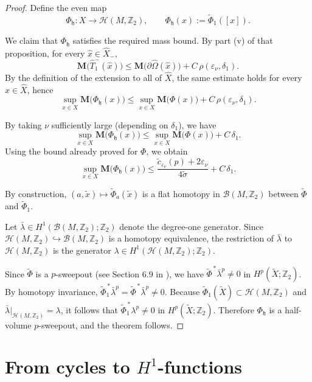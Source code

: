\documentclass[12pt,english]{article}
\theoremstyle{definition}
\begin{document}
\begin{proof}
Define the even map
\[
\Phi_{\mathfrak h}:X\to \mathcal H(M,\mathbb{Z}_2),\qquad \Phi_{\mathfrak h}(x):=\tilde\Phi_1([x]).
\]

We claim that $\Phi_{\mathfrak h}$ satisfies the required mass bound. By part (v) of that proposition, for every $\hat x\in \widehat X_-$,
\[
\mathbf M\bigl(\widehat T_1^-(\hat x)\bigr)
\le \mathbf M\bigl(\partial\widehat\Omega(\hat x)\bigr)+C\,\rho(\varepsilon_\nu,\delta_1).
\]
By the definition of the extension to all of $\widehat X$, the same estimate holds for every
$\hat x\in\widehat X$, hence
\[
\sup_{x\in X}\mathbf M\bigl(\Phi_{\mathfrak h}(x)\bigr)
\le
\sup_{x\in X}\mathbf M\bigl(\Phi(x)\bigr)+C\,\rho(\varepsilon_\nu,\delta_1).
\]

By taking $\nu$ sufficiently large (depending on $\delta_1$), we have
\[
\sup_{x\in X}\mathbf M\bigl(\Phi_{\mathfrak h}(x)\bigr)
\le
\sup_{x\in X}\mathbf M\bigl(\Phi(x)\bigr)+C\,\delta_1.
\]
Using the bound already proved for $\Phi$, we obtain
\[
\sup_{x\in X}\mathbf M\bigl(\Phi_{\mathfrak h}(x)\bigr)
\le
\frac{\tilde c_{\varepsilon_\nu}(p)+2\varepsilon_\nu}{4\tilde\sigma}+ C\,\delta_1.
\]

By construction, $(a,\tilde x)\mapsto \tilde\Phi_a(\tilde x)$ is a flat homotopy in $\mathcal B(M,\mathbb{Z}_2)$
between $\tilde\Phi$ and $\tilde\Phi_1$.

Let $\bar\lambda\in H^1(\mathcal B(M,\mathbb{Z}_2);\mathbb{Z}_2)$ denote the degree-one generator. Since
$\mathcal H(M,\mathbb{Z}_2)\hookrightarrow \mathcal B(M,\mathbb{Z}_2)$ is a homotopy equivalence, the restriction of
$\bar\lambda$ to $\mathcal H(M,\mathbb{Z}_2)$ is the generator $\lambda\in H^1(\mathcal H(M,\mathbb{Z}_2);\mathbb{Z}_2)$.

Since $\tilde\Phi$ is a $p$-sweepout (see Section 6.9 in \cite{GG2}), we have $\tilde\Phi^{\,*}\bar\lambda^p\neq 0$ in $H^p(\tilde X;\mathbb{Z}_2)$. By homotopy invariance, $\tilde\Phi_1^{\,*}\bar\lambda^p=\tilde\Phi^{\,*}\bar\lambda^p\neq 0.$
Because $\tilde\Phi_1(\tilde X)\subset \mathcal H(M,\mathbb{Z}_2)$ and $\bar\lambda|_{\mathcal H(M,\mathbb{Z}_2)}=\lambda$, it follows that $\tilde\Phi_1^{\,*}\lambda^p\neq 0$ in $H^p(\tilde X;\mathbb{Z}_2)$. Therefore $\Phi_\mathfrak h$ is a half-volume $p$-sweepout, and the theorem follows.
\end{proof}

\section{From cycles to $H^1$-functions}
\label{sec:cycles-to-phase}
\end{document}
